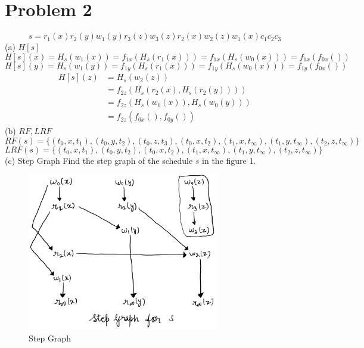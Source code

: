 \documentclass[12pt]{article}
\begin{document}
\section*{Problem 2}
\begin{equation*}
    s = r_1(x) r_2(y) w_1(y) r_3(z) w_3(z) r_2(x) w_2(z) w_1(x) c_1 c_2 c_3
\end{equation*}
(a) $H[s]$
\begin{equation*}
    H[s](x) = H_s(w_1(x)) = f_{1x}(H_s(r_1(x))) = f_{1x}(H_s(w_0(x))) = f_{1x}(f_{0x}())
\end{equation*} 
\begin{equation*}
    H[s](y) = H_s(w_1(y)) = f_{1y}(H_s(r_1(x))) = f_{1y}(H_s(w_0(x))) = f_{1y}(f_{0x}())
\end{equation*}
\begin{equation*}
    \begin{split}
        H[s](z) &= H_s(w_2(z)) \\
        &= f_{2z}(H_s(r_2(x), H_s(r_2(y))))  \\ 
        &= f_{2z}(H_s(w_0(x)), H_s(w_0(y))) \\
        &= f_{2z}(f_{0x}(), f_{0y}())
    \end{split}
\end{equation*}
(b) $ RF, LRF $
\begin{equation*}
    RF(s) = \{(t_0, x, t_1), (t_0, y, t_2), (t_0, z, t_3), (t_0, x, t_2), (t_1, x, t_\infty), (t_1, y, t_\infty), (t_2, z, t_\infty)\}
\end{equation*}
\begin{equation*}
    LRF(s) = \{(t_0, x, t_1), (t_0, y, t_2), (t_0, x, t_2), (t_1, x, t_\infty), (t_1, y, t_\infty), (t_2, z, t_\infty)\}
\end{equation*}
(c) Step Graph
Find the step graph of the schedule $s$ in the figure 1.
\begin{figure}[h]
    \centering
    \includegraphics[width=0.75\textwidth]{images/stepGraph.jpg}
    \caption{Step Graph}
\end{figure}
\end{document}
